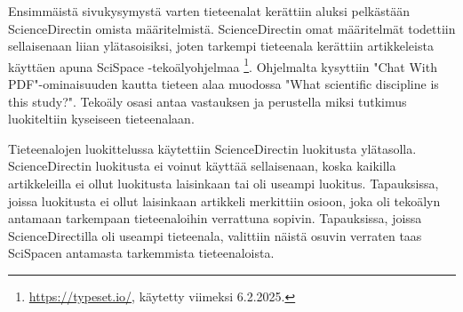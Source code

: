 \documentclass[utf8]{gradu3}
\begin{document}
\begin{table}[h]
\centering
{}
\caption{Testauserän kategoriat}
\label{table: testausera}
\end{table}

Ensimmäistä sivukysymystä varten tieteenalat kerättiin aluksi 
pelkästään ScienceDirectin omista määritelmistä. 
ScienceDirectin omat määritelmät todettiin sellaisenaan liian ylätasoisiksi, 
joten tarkempi tieteenala kerättiin artikkeleista käyttäen apuna 
SciSpace -tekoälyohjelmaa 
\footnote{\url{https://typeset.io/}, käytetty viimeksi 6.2.2025.}. 
Ohjelmalta kysyttiin "Chat With PDF"-ominaisuuden 
kautta tieteen alaa muodossa "What scientific discipline is this study?". 
Tekoäly osasi antaa vastauksen ja perustella miksi tutkimus 
luokiteltiin kyseiseen tieteenalaan. 
\begin{comment}
    TODO: Tarkempi tieteenala varmaankin turha, ehkä lisätään ne vain liitteeksi loppuun, niitä kuitenkin käytettiin Science Directin alojen korjauksessa.
\end{comment}

Tieteenalojen luokittelussa käytettiin ScienceDirectin luokitusta ylätasolla.
ScienceDirectin luokitusta ei voinut käyttää sellaisenaan, koska kaikilla artikkeleilla ei ollut luokitusta laisinkaan tai oli useampi luokitus. Tapauksissa, joissa luokitusta ei ollut laisinkaan artikkeli merkittiin osioon,
joka oli tekoälyn antamaan tarkempaan tieteenaloihin verrattuna sopivin.
Tapauksissa, joissa ScienceDirectilla oli useampi tieteenala, valittiin näistä
osuvin verraten taas SciSpacen antamasta tarkemmista tieteenaloista.
\end{document}
